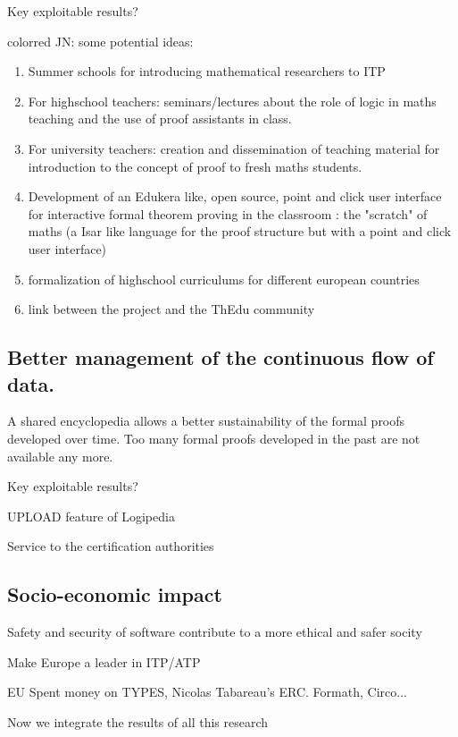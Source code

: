 {\color{red} Key exploitable results?}

{color{red} JN:  some potential ideas:}
\begin{enumerate}
\item Summer schools for introducing mathematical researchers to ITP
\item For highschool teachers: seminars/lectures about  the role of logic in maths teaching and the use of proof assistants in class.
\item For university teachers: creation and dissemination of teaching material for introduction to the concept of proof to fresh maths students.   
\item Development of an Edukera like, open source, point and click user interface for interactive formal theorem proving in the classroom : the "scratch" of maths  (a Isar like language for the proof structure but with a point and click user interface)
\item formalization of  highschool curriculums for different european countries
\item link between the project and the ThEdu community
\end{enumerate}

\subsection{Better management of the continuous flow of data.}

A shared encyclopedia allows a better sustainability of the formal
proofs developed over time. Too many formal proofs developed in the
past are not available any more.

{\color{red} Key exploitable results?}

UPLOAD feature of {\sf Logipedia}

Service to the certification authorities

\subsection{Socio-economic impact}

{\color{red} Safety and security of software contribute to a more ethical
  and safer socity}

Make Europe a leader in ITP/ATP

EU Spent money on TYPES, Nicolas Tabareau's ERC. Formath, Circo... 

Now we integrate the results of all this research

